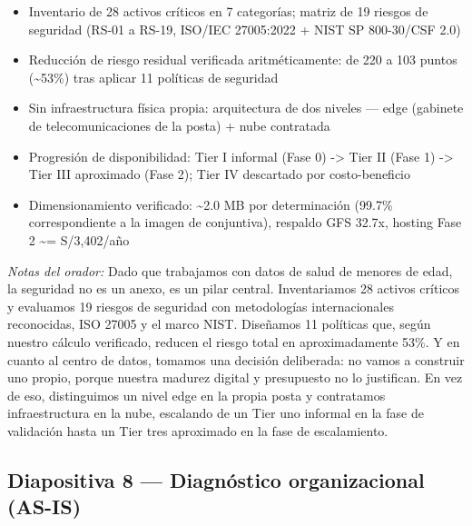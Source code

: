 \documentclass[11pt,a4paper]{article}
\providecommand{\tightlist}{%
  \setlength{\itemsep}{0pt}\setlength{\parskip}{0pt}}
\begin{document}
\begin{itemize}
\tightlist
\item
  Inventario de 28 activos críticos en 7 categorías; matriz de 19 riesgos de seguridad (RS-01 a RS-19, ISO/IEC 27005:2022 + NIST SP 800-30/CSF 2.0)
\item
  Reducción de riesgo residual verificada aritméticamente: de 220 a 103 puntos (\textasciitilde53\%) tras aplicar 11 políticas de seguridad
\item
  Sin infraestructura física propia: arquitectura de dos niveles --- edge (gabinete de telecomunicaciones de la posta) + nube contratada
\item
  Progresión de disponibilidad: Tier I informal (Fase 0) -\textgreater{} Tier II (Fase 1) -\textgreater{} Tier III aproximado (Fase 2); Tier IV descartado por costo-beneficio
\item
  Dimensionamiento verificado: \textasciitilde2.0 MB por determinación (99.7\% correspondiente a la imagen de conjuntiva), respaldo GFS 32.7x, hosting Fase 2 \textasciitilde= S/3,402/año
\end{itemize}

\emph{Notas del orador:} Dado que trabajamos con datos de salud de menores de edad, la seguridad no es un anexo, es un pilar central. Inventariamos 28 activos críticos y evaluamos 19 riesgos de seguridad con metodologías internacionales reconocidas, ISO 27005 y el marco NIST. Diseñamos 11 políticas que, según nuestro cálculo verificado, reducen el riesgo total en aproximadamente 53\%. Y en cuanto al centro de datos, tomamos una decisión deliberada: no vamos a construir uno propio, porque nuestra madurez digital y presupuesto no lo justifican. En vez de eso, distinguimos un nivel edge en la propia posta y contratamos infraestructura en la nube, escalando de un Tier uno informal en la fase de validación hasta un Tier tres aproximado en la fase de escalamiento.

\subsection{Diapositiva 8 --- Diagnóstico organizacional (AS-IS)}\label{diapositiva-8-diagnuxf3stico-organizacional-as-is}
\end{document}
